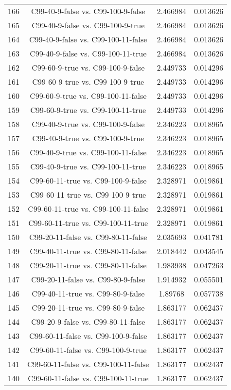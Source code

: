 \documentclass[a4paper,10pt]{article}
\begin{document}
\begin{landscape}
\begin{table}[!htp]
\begin{tabular}{cccc}
166&C99-40-9-false vs. C99-100-9-false&2.466984&0.013626\\
165&C99-40-9-false vs. C99-100-9-true&2.466984&0.013626\\
164&C99-40-9-false vs. C99-100-11-false&2.466984&0.013626\\
163&C99-40-9-false vs. C99-100-11-true&2.466984&0.013626\\
162&C99-60-9-true vs. C99-100-9-false&2.449733&0.014296\\
161&C99-60-9-true vs. C99-100-9-true&2.449733&0.014296\\
160&C99-60-9-true vs. C99-100-11-false&2.449733&0.014296\\
159&C99-60-9-true vs. C99-100-11-true&2.449733&0.014296\\
158&C99-40-9-true vs. C99-100-9-false&2.346223&0.018965\\
157&C99-40-9-true vs. C99-100-9-true&2.346223&0.018965\\
156&C99-40-9-true vs. C99-100-11-false&2.346223&0.018965\\
155&C99-40-9-true vs. C99-100-11-true&2.346223&0.018965\\
154&C99-60-11-true vs. C99-100-9-false&2.328971&0.019861\\
153&C99-60-11-true vs. C99-100-9-true&2.328971&0.019861\\
152&C99-60-11-true vs. C99-100-11-false&2.328971&0.019861\\
151&C99-60-11-true vs. C99-100-11-true&2.328971&0.019861\\
150&C99-20-11-false vs. C99-80-11-false&2.035693&0.041781\\
149&C99-40-11-true vs. C99-80-11-false&2.018442&0.043545\\
148&C99-20-11-true vs. C99-80-11-false&1.983938&0.047263\\
147&C99-20-11-false vs. C99-80-9-false&1.914932&0.055501\\
146&C99-40-11-true vs. C99-80-9-false&1.89768&0.057738\\
145&C99-20-11-true vs. C99-80-9-false&1.863177&0.062437\\
144&C99-20-9-false vs. C99-80-11-false&1.863177&0.062437\\
143&C99-60-11-false vs. C99-100-9-false&1.863177&0.062437\\
142&C99-60-11-false vs. C99-100-9-true&1.863177&0.062437\\
141&C99-60-11-false vs. C99-100-11-false&1.863177&0.062437\\
140&C99-60-11-false vs. C99-100-11-true&1.863177&0.062437\\

\end{tabular}
\end{table}
\end{landscape}
\end{document}
